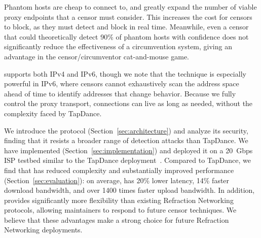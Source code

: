 \documentclass[sigconf]{acmart}
\begin{document}

Phantom hosts are cheap to connect to, and greatly expand the 
number of viable proxy endpoints that a censor must consider. This increases the cost for censors to
block, as they must detect and block in real time. Meanwhile, even a censor that
could theoretically detect 90\% of phantom hosts with confidence does not significantly reduce the
effectiveness of a circumvention system, giving \scheme an advantage in the censor/circumventor
cat-and-mouse game.

\scheme supports both IPv4 and IPv6,
though we note that the technique is especially
powerful in IPv6, where censors cannot exhaustively scan the address space
ahead of time to identify addresses that change behavior.
Because we fully control the proxy transport, connections can live as
long as needed, without the complexity faced by TapDance.




We introduce the \scheme protocol (Section~\ref{sec:architecture})
and analyze its security, finding that it resists a broader
range of detection attacks than TapDance.
We have implemented \scheme (Section~\ref{sec:implementation})
and deployed it on a 20~Gbps ISP testbed similar to the TapDance
deployment~\cite{frolov2017isp}.  Compared to TapDance, we find that
\scheme has reduced complexity and substantially improved performance
(Section~\ref{sec:evaluation}): on average, \scheme has 20\% lower latency,
14\% faster download bandwidth, and over 1400 times faster upload bandwidth.
In addition, \scheme provides significantly
more flexibility than existing Refraction Networking protocols, allowing maintainers to
respond to future censor techniques.
We believe that these advantages
make \scheme a strong choice for future Refraction Networking deployments.
\end{document}
